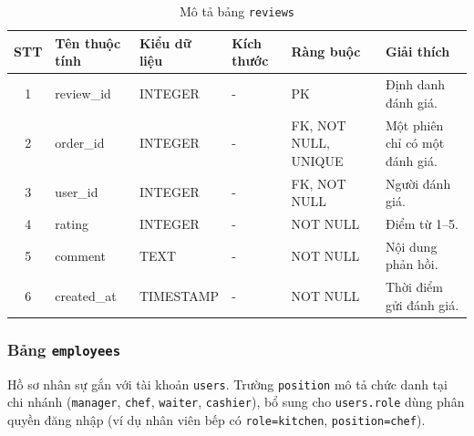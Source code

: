 \documentclass[../DoAn.tex]{subfiles}
\begin{document}
\begin{table}[H]
\centering
\renewcommand{\arraystretch}{1.3}
\small
\begin{tabularx}{\textwidth}{|c|>{\RaggedRight\arraybackslash}p{2.9cm}|>{\Centering\arraybackslash}p{2.2cm}|>{\Centering\arraybackslash}p{1.3cm}|>{\Centering\arraybackslash}p{2.2cm}|>{\RaggedRight\arraybackslash}X|}
\hline
\textbf{STT} & \textbf{Tên thuộc tính} & \textbf{Kiểu dữ liệu} & \textbf{Kích thước} & \textbf{Ràng buộc} & \textbf{Giải thích} \\
\hline
1 & review\_id & INTEGER & - & PK & Định danh đánh giá. \\ \hline
2 & order\_id & INTEGER & - & FK, NOT NULL, UNIQUE & Một phiên chỉ có một đánh giá. \\ \hline
3 & user\_id & INTEGER & - & FK, NOT NULL & Người đánh giá. \\ \hline
4 & rating & INTEGER & - & NOT NULL & Điểm từ 1--5. \\ \hline
5 & comment & TEXT & - & NOT NULL & Nội dung phản hồi. \\ \hline
6 & created\_at & TIMESTAMP & - & NOT NULL & Thời điểm gửi đánh giá. \\ \hline
\end{tabularx}
\caption{Mô tả bảng \texttt{reviews}}
\end{table}

\subsubsection{Bảng \texttt{employees}}

Hồ sơ nhân sự gắn với tài khoản \texttt{users}. Trường \texttt{position} mô tả chức danh tại chi nhánh
(\texttt{manager}, \texttt{chef}, \texttt{waiter}, \texttt{cashier}), bổ sung cho \texttt{users.role}
dùng phân quyền đăng nhập (ví dụ nhân viên bếp có \texttt{role=kitchen}, \texttt{position=chef}).
\end{document}
